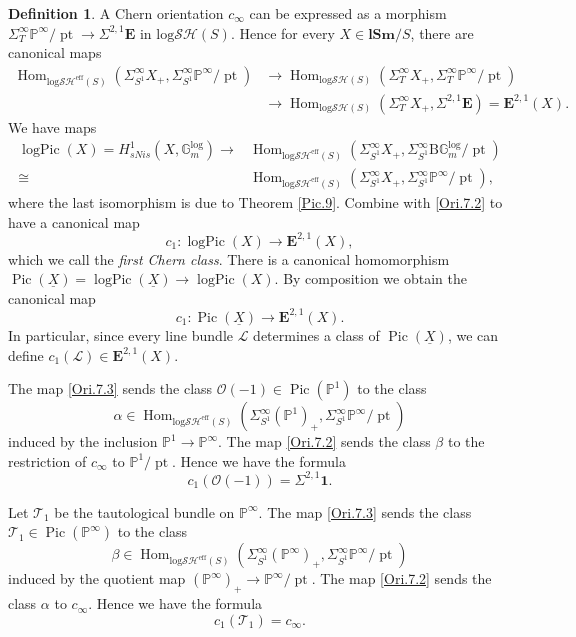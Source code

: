 \documentclass[11pt, a4paper]{amsart}
\theoremstyle{definition}
\newtheorem{df}[thm]{Definition}
\numberwithin{equation}{subsection}
\renewcommand{\P}{\mathbb{P}}
\newcommand{\lSm}{\mathbf{lSm}}
\newcommand{\Pic}{\operatorname{Pic}}		 %
\renewcommand{\hom}{\operatorname{Hom}}				 %
\newcommand{\pt}[1]{\mathrm{\pt}_{#1}}
\renewcommand{\ul}{\underline}
\newcommand{\clspace}{\mathrm{B}}
\newcommand{\logPic}{\operatorname{logPic}}
\newcommand{\cE}{\mathcal{E}}
\newcommand{\cL}{\mathcal{L}}
\newcommand{\cO}{\mathcal{O}}
\newcommand{\cT}{\mathcal{T}}
\newcommand{\Gmm}{\mathbb{G}_m^{\mathrm{log}}}
\def\pt{\operatorname{pt}}
\newcommand{\unit}{\mathbf{1}}
\newcommand{\ringE}{\mathbf{E}}
\newcommand{\inflogSH}{\mathrm{log}\mathcal{SH}}
\newcommand{\inflogSHS}{\mathrm{log}\mathcal{SH}^{\mathrm{eff}}}
\begin{document}
\begin{df}
A Chern orientation $c_\infty$ can be expressed as a morphism $\Sigma_T^\infty \P^\infty/\pt \to \Sigma^{2,1}\ringE$ in $\inflogSH(S)$.
Hence for every $X\in \lSm/S$, there are canonical maps
\begin{equation}
\label{Ori.7.2}
\begin{split}
\hom_{\inflogSHS(S)}(\Sigma_{S^1}^\infty X_+,\Sigma_{S^1}^\infty \P^\infty/\pt)
&\to
\hom_{\inflogSH(S)}(\Sigma_T^\infty X_+,\Sigma_T^\infty \P^\infty/\pt)
\\
&\to
\hom_{\inflogSH(S)}(\Sigma_T^\infty X_+,\Sigma^{2,1}\ringE)
=
\ringE^{2,1}(X).
\end{split}
\end{equation}
We have maps
\begin{equation}
\label{Ori.7.3}
\begin{split}
\logPic(X)
=
H_{sNis}^1(X,\Gmm)
\to &
\hom_{\inflogSHS(S)}(\Sigma_{S^1}^\infty X_+,\Sigma_{S^1}^\infty \clspace\Gmm/\pt)
\\
\cong &
\hom_{\inflogSHS(S)}(\Sigma_{S^1}^\infty X_+,\Sigma_{S^1}^\infty \P^\infty/\pt),
\end{split}
\end{equation}
where the last isomorphism is due to Theorem \ref{Pic.9}.
Combine with \eqref{Ori.7.2} to have a canonical map
\[
c_1\colon \logPic(X)\to \ringE^{2,1}(X),
\]
which we call the \emph{first Chern class}.  \index[notation]{c1 @ $c_1(\cE)$}
There is a canonical homomorphism $\Pic(\ul{X})=\logPic(\ul{X})\to \logPic(X)$.
By composition we obtain the canonical map
\[
c_1\colon \Pic(\ul{X})\to \ringE^{2,1}(X).
\]
In particular, since every line bundle $\cL$ determines a class of $\Pic(\ul{X})$, we can define $c_1(\cL)\in \ringE^{2,1}(X)$.

The map \eqref{Ori.7.3} sends the class $\cO(-1)\in\Pic(\P^1)$ to the class
\[
\alpha\in \hom_{\inflogSHS(S)}(\Sigma_{S^1}^\infty (\P^1)_+,\Sigma_{S^1}^\infty \P^\infty/\pt)
\]
induced by the inclusion $\P^1\to \P^\infty$.
The map \eqref{Ori.7.2} sends the class $\beta$ to the restriction of $c_\infty$ to $\P^1/\pt$.
Hence we have the formula
\begin{equation}
\label{Ori.7.11}
c_1(\cO(-1))=\Sigma^{2,1}\unit.
\end{equation}

Let $\cT_1$ be the tautological bundle on $\P^\infty$.
The map \eqref{Ori.7.3} sends the class $\cT_1\in \Pic(\P^\infty)$ to the class
\[
\beta\in \hom_{\inflogSHS(S)}(\Sigma_{S^1}^\infty (\P^\infty)_+,\Sigma_{S^1}^\infty \P^\infty/\pt)
\]
induced by the quotient map $(\P^\infty)_+\to \P^\infty/\pt$.
The map \eqref{Ori.7.2} sends the class $\alpha$ to $c_\infty$.
Hence we have the formula
\begin{equation}
\label{Ori.7.12}
c_1(\cT_1)=c_\infty.
\end{equation}
\end{df}
\end{document}
